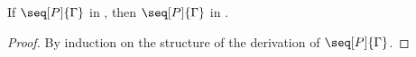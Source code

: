 \begin{theorem}\label{thm:cp2hcp-typing}
  If $\seq[P]{\Gamma}$ in \cp, then $\seq[P]{\Gamma}$ in \hcp.
\end{theorem}
\begin{proof}
  By induction on the structure of the derivation of $\seq[P]{\Gamma}$.
\end{proof}
